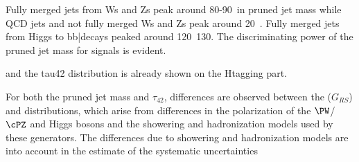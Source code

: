 



Fully merged jets from Ws and Zs peak around 80-90~\GeV in pruned jet mass while QCD jets and not fully merged Ws and Zs peak around 20~\GeV.
Fully merged jets from Higgs to bb\bar decays peaked around 120~130\GeV. 
The discriminating power of the pruned jet mass for signals is evident.

and the tau42 distribution is already shown on the Htagging part. 

For both the pruned jet mass and $\tau_{42}$, differences are observed
between the \HERWIG{++} ($G_{RS}$) and 
distributions, which arise from
differences in the polarization of the $\PW$/$\cPZ $ and Higgs bosons and the
showering and hadronization models used by these generators. 
The differences due to showering and hadronization models
are into account in the estimate of the systematic uncertainties




